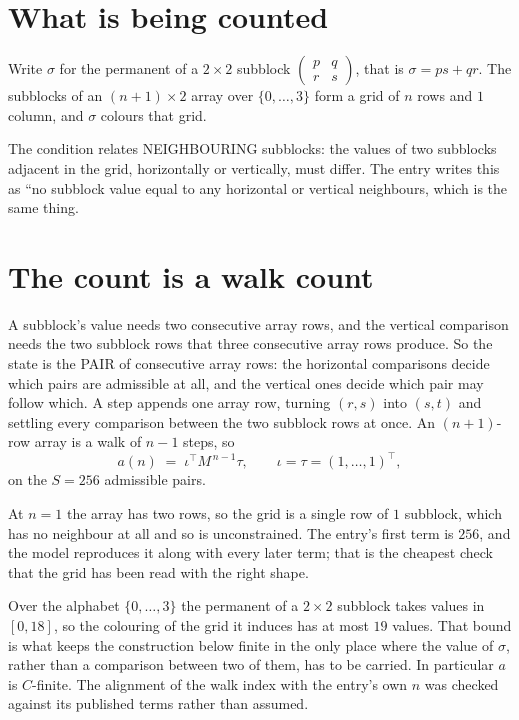 \documentclass[11pt,a4paper]{article}
\theoremstyle{plain}
\theoremstyle{definition}
\begin{document}
\section{What is being counted}

Write $\sigma$ for the permanent of a $2\times2$ subblock
$\begin{pmatrix}p&q\\r&s\end{pmatrix}$, that is $\sigma=ps+qr$. The subblocks of an
$(n+1)\times2$ array over $\{0,\dots,3\}$ form a grid of $n$ rows and $1$
column, and $\sigma$ colours that grid.

The condition relates NEIGHBOURING subblocks: the values of two subblocks adjacent in the grid,
horizontally or vertically, must differ. The entry writes this as ``no subblock value equal to any horizontal or vertical neighbours, which is the same thing.

\section{The count is a walk count}

A subblock's value needs two consecutive array rows, and the vertical
comparison needs the two subblock rows that three consecutive array rows produce. So the state
is the PAIR of consecutive array rows: the horizontal comparisons decide which pairs are
admissible at all, and the vertical ones decide which pair may follow which. A step appends one
array row, turning $(r,s)$ into $(s,t)$ and settling every comparison between the two subblock
rows at once. An $(n+1)$-row array is a walk of $n-1$ steps, so
\[
a(n)\;=\;\iota^{\!\top}M^{\,n-1}\tau,\qquad\iota=\tau=(1,\dots,1)^{\!\top},
\]
on the $S=256$ admissible pairs.

At $n=1$ the array has two rows, so the grid is a single row of $1$
subblock, which has no neighbour at all and so is unconstrained. The
entry's first term is $256$, and the model reproduces it along with every later term; that
is the cheapest check that the grid has been read with the right shape.

Over the alphabet $\{0,\dots,3\}$ the permanent of a $2\times2$ subblock takes values in
$[0,18]$, so the colouring of the grid it induces has at most $19$ values.
That bound is what keeps the construction below finite in the only place where the value of
$\sigma$, rather than a comparison between two of them, has to be carried.
In particular $a$ is $C$-finite. The alignment of the walk index with the entry's own $n$ was
checked against its published terms rather than assumed.
\end{document}
